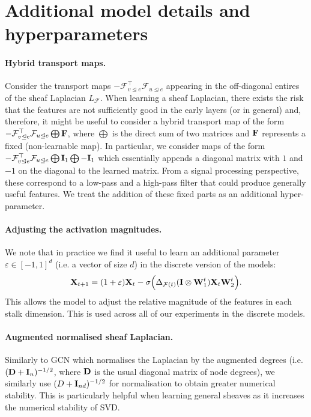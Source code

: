 \documentclass{article}
\def\mD{{\bf{D}}}
\def\mF{{\bf{F}}}
\def\mI{{\bf{I}}}
\def\mW{{\bf{W}}}
\def\mX{{\bf{X}}}
\def\gF{{\mathcal{F}}}
\newcommand{\tleq}{\trianglelefteq}
\begin{document}
\section{Additional model details and hyperparameters}\label{app:hyperparams}

\paragraph{Hybrid transport maps.} Consider the transport maps $-\gF_{v \tleq e}^\top\gF_{u \tleq e}$ appearing in the off-diagonal entires of the sheaf Laplacian $L_\gF$. When learning a sheaf Laplacian, there exists the risk that the features are not sufficiently good in the early layers (or in general) and, therefore, it might be useful to consider a hybrid transport map of the form $-\gF_{v \tleq e}^\top\gF_{u \tleq e} \bigoplus \mF$, where $\bigoplus$ is the direct sum of two matrices and $\mF$ represents a fixed (non-learnable map). In particular, we consider maps of the form $-\gF_{v \tleq e}^\top\gF_{u \tleq e} \bigoplus \mI_1 \bigoplus -\mI_1$ which essentially appends a diagonal matrix with $1$ and $-1$ on the diagonal to the learned matrix. From a signal processing perspective, these correspond to a low-pass and a high-pass filter that could produce generally useful features. We treat the addition of these fixed parts as an additional hyper-parameter.  

\paragraph{Adjusting the activation magnitudes.} We note that in practice we find it useful to learn an additional parameter $\varepsilon \in [-1, 1]^d$ (i.e. a vector of size $d$) in the discrete version of the models:
\begin{equation}
    \mX_{t+1} = (1 + \varepsilon)\mX_{t} - \sigma \Big(\Delta_{\gF(t)} (\mI \otimes \mW_1^t) \mX_t \mW_2^t \Big). 
\end{equation}
This allows the model to adjust the relative magnitude of the features in each stalk dimension. This is used across all of our experiments in the discrete models. 

\paragraph{Augmented normalised sheaf Laplacian.} Similarly to GCN which normalises the Laplacian by the augmented degrees (i.e. $(\mD + \mI_n)^{-1/2}$, where $\mD$ is the usual diagonal matrix of node degrees), we similarly use $(D + \mI_{nd})^{-1/2}$ for normalisation to obtain greater numerical stability. This is particularly helpful when learning general sheaves as it increases the numerical stability of SVD. 
\end{document}
